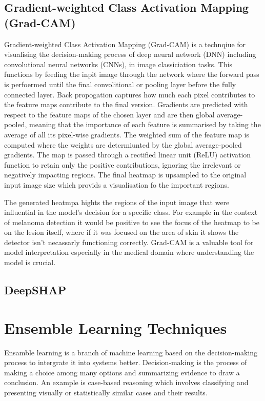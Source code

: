 \subsection{Gradient-weighted Class Activation Mapping (Grad-CAM)}
Gradient-weighted Class Activation Mapping (Grad-CAM) is a technqiue for visualising the decision-making process of deep neural network (DNN) including convolutional neural networks (CNNs), in image classiciation tasks. This functions by feeding the inpit image through the network where the forward pass is perfoermed until the final convolitional or pooling layer before the fully connected layer. Back propogation captures how much each pixel contributes to the feature maps contribute to the final version. Gradients are predicted with respect to the feature maps of the chosen layer and are then global average-pooled, meaning that the importance of each feature is summarised by taking the average of all its pixel-wise gradients. The weighted sum of the feature map is computed where the weights are determiunted by the global average-pooled gradients. The map is passed through a rectified linear unit (ReLU) activation function to retain only the positive contributions, ignoring the irrelevant or negatively impacting regions. The final heatmap is upsampled to the original input image size which provids a visualisation fo the important regions.

The generated heatmpa hights the regions of the input image that were influential in the model's decision for a specific class. For example in the context of melanoma detection it would be positive to see the focus of the heatmap to be on the lesion itself, where if it was focused on the area of skin it shows the detector isn't necassarly functioning correctly. Grad-CAM is a valuable tool for model interpretation especially in the medical domain where understanding the model is crucial.

\subsection{DeepSHAP}




\section{Ensemble Learning Techniques}
Ensamble learning is a branch of machine learning based on the decision-making process to intergrate it into systems better\cite{xu2022}. Decision-making is the process of making a choice among many options and summarizing evidence to draw a conclusion. An example is case-based reasoning which involves classifying and presenting visually or statistically similar cases and their results.

